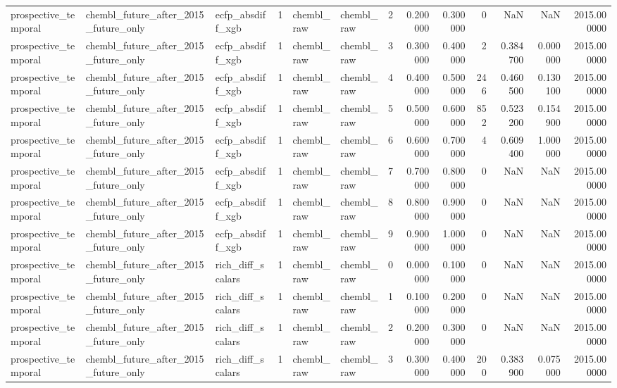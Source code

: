 \begin{longtable}{lllrllrrrrrrr}
prospective\_temporal & chembl\_future\_after\_2015\_future\_only & ecfp\_absdiff\_xgb & 1 & chembl\_raw & chembl\_raw & 2 & 0.200000 & 0.300000 & 0 & NaN & NaN & 2015.000000 \\
prospective\_temporal & chembl\_future\_after\_2015\_future\_only & ecfp\_absdiff\_xgb & 1 & chembl\_raw & chembl\_raw & 3 & 0.300000 & 0.400000 & 2 & 0.384700 & 0.000000 & 2015.000000 \\
prospective\_temporal & chembl\_future\_after\_2015\_future\_only & ecfp\_absdiff\_xgb & 1 & chembl\_raw & chembl\_raw & 4 & 0.400000 & 0.500000 & 246 & 0.460500 & 0.130100 & 2015.000000 \\
prospective\_temporal & chembl\_future\_after\_2015\_future\_only & ecfp\_absdiff\_xgb & 1 & chembl\_raw & chembl\_raw & 5 & 0.500000 & 0.600000 & 852 & 0.523200 & 0.154900 & 2015.000000 \\
prospective\_temporal & chembl\_future\_after\_2015\_future\_only & ecfp\_absdiff\_xgb & 1 & chembl\_raw & chembl\_raw & 6 & 0.600000 & 0.700000 & 4 & 0.609400 & 1.000000 & 2015.000000 \\
prospective\_temporal & chembl\_future\_after\_2015\_future\_only & ecfp\_absdiff\_xgb & 1 & chembl\_raw & chembl\_raw & 7 & 0.700000 & 0.800000 & 0 & NaN & NaN & 2015.000000 \\
prospective\_temporal & chembl\_future\_after\_2015\_future\_only & ecfp\_absdiff\_xgb & 1 & chembl\_raw & chembl\_raw & 8 & 0.800000 & 0.900000 & 0 & NaN & NaN & 2015.000000 \\
prospective\_temporal & chembl\_future\_after\_2015\_future\_only & ecfp\_absdiff\_xgb & 1 & chembl\_raw & chembl\_raw & 9 & 0.900000 & 1.000000 & 0 & NaN & NaN & 2015.000000 \\
prospective\_temporal & chembl\_future\_after\_2015\_future\_only & rich\_diff\_scalars & 1 & chembl\_raw & chembl\_raw & 0 & 0.000000 & 0.100000 & 0 & NaN & NaN & 2015.000000 \\
prospective\_temporal & chembl\_future\_after\_2015\_future\_only & rich\_diff\_scalars & 1 & chembl\_raw & chembl\_raw & 1 & 0.100000 & 0.200000 & 0 & NaN & NaN & 2015.000000 \\
prospective\_temporal & chembl\_future\_after\_2015\_future\_only & rich\_diff\_scalars & 1 & chembl\_raw & chembl\_raw & 2 & 0.200000 & 0.300000 & 0 & NaN & NaN & 2015.000000 \\
prospective\_temporal & chembl\_future\_after\_2015\_future\_only & rich\_diff\_scalars & 1 & chembl\_raw & chembl\_raw & 3 & 0.300000 & 0.400000 & 200 & 0.383900 & 0.075000 & 2015.000000 \\

\end{longtable}
